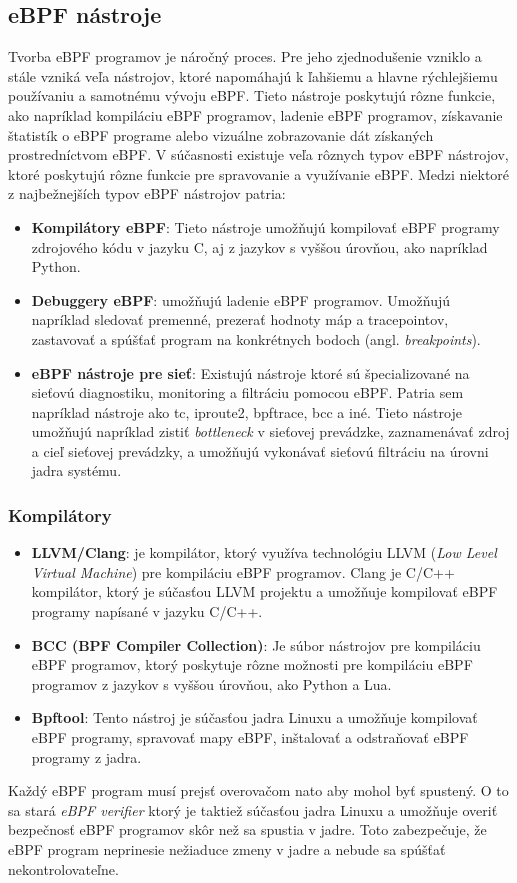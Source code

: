 \subsection{eBPF nástroje}
Tvorba eBPF programov je náročný proces. Pre jeho zjednodušenie vzniklo a stále vzniká veľa nástrojov, ktoré napomáhajú k ľahšiemu a hlavne rýchlejšiemu 
používaniu a samotnému vývoju eBPF. Tieto nástroje poskytujú rôzne funkcie, ako napríklad kompiláciu eBPF programov, ladenie eBPF programov, získavanie štatistík o eBPF 
programe alebo vizuálne zobrazovanie dát získaných prostredníctvom  eBPF. V súčasnosti existuje veľa rôznych typov eBPF nástrojov, 
ktoré poskytujú rôzne funkcie pre spravovanie a využívanie eBPF. 
Medzi niektoré z najbežnejších typov eBPF nástrojov patria:
\begin{itemize}
    \item \textbf{Kompilátory eBPF}: Tieto nástroje umožňujú kompilovať eBPF programy zdrojového kódu v jazyku C, aj z jazykov s vyššou úrovňou, 
    ako napríklad Python.
    \item \textbf{Debuggery eBPF}: umožňujú ladenie eBPF programov. Umožňujú napríklad sledovať premenné, 
    prezerať hodnoty máp a tracepointov, zastavovať a spúšťať program na konkrétnych bodoch (angl. \emph{breakpoints}).
    \item \textbf{eBPF nástroje pre sieť}: Existujú nástroje ktoré sú špecializované na sieťovú diagnostiku, monitoring a filtráciu pomocou eBPF. 
    Patria sem napríklad nástroje ako tc, iproute2, bpftrace, bcc a iné. Tieto nástroje umožňujú napríklad zistiť \emph{bottleneck} v sieťovej prevádzke, 
    zaznamenávať zdroj a cieľ sieťovej prevádzky, a umožňujú vykonávať sieťovú filtráciu na úrovni jadra systému.
\end{itemize}

\subsubsection{Kompilátory}
\begin{itemize}
    \item \textbf{LLVM/Clang}: je kompilátor, ktorý využíva technológiu LLVM (\emph{Low Level Virtual Machine}) pre kompiláciu eBPF programov. 
    Clang je C/C++ kompilátor, ktorý je súčasťou LLVM projektu a umožňuje kompilovať eBPF programy napísané v jazyku C/C++.
    \item \textbf{BCC (BPF Compiler Collection)}: Je súbor nástrojov pre kompiláciu eBPF programov, ktorý poskytuje rôzne možnosti pre kompiláciu eBPF 
    programov z jazykov s vyššou úrovňou, ako Python a Lua.~\cite{bcc}
    \item \textbf{Bpftool}: Tento nástroj je súčasťou jadra Linuxu a umožňuje kompilovať eBPF programy, spravovať mapy eBPF, 
    inštalovať a odstraňovať eBPF programy z jadra.
\end{itemize}
Každý eBPF program musí prejsť overovačom  nato aby mohol byť spustený. O to sa stará \emph{eBPF verifier} 
ktorý je taktiež súčasťou jadra Linuxu a umožňuje overiť bezpečnosť eBPF programov skôr než sa spustia v jadre. 
Toto zabezpečuje, že eBPF program neprinesie nežiaduce zmeny v jadre a nebude sa spúšťať nekontrolovateľne.

